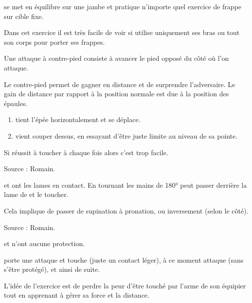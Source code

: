 \begin{exercice}
\A se met en équilibre sur une jambe et pratique n'importe quel exercice de frappe sur cible fixe.

Dans cet exercice il est très facile de voir si \A utilise uniquement ses bras ou tout son corps pour porter ses frappes.
\end{exercice}


\begin{coup}
\label{struct:coup:contre-pied}

Une attaque à contre-pied consiste à avancer le pied opposé du côté où l'on attaque.
\end{coup}

Le contre-pied permet de gagner en distance et de surprendre l'adversaire.
Le gain de distance par rapport à la position normale est due à la position des épaules.


\begin{exercice}

\begin{enumerate}
	\item \D tient l'épée horizontalement et se déplace.
	
	\item \A vient couper dessus, en essayant d'être juste limite au niveau de sa pointe.
\end{enumerate}

Si \A réussit à toucher à chaque fois alors c'est trop facile.

Source : Romain.

\end{exercice}


\begin{technique}
\label{struct:tech:changement-ligne}

\A et \D ont les lames en contact.
En tournant les mains de 180° \A peut passer derrière la lame de \D et le toucher.

Cela implique de passer de supination à pronation, ou inversement (selon le côté).

Source : Romain.
\end{technique}


\begin{exercice}
\A et \D n'ont aucune protection.

\A porte une attaque et touche \D (juste un contact léger), à ce moment \D attaque \A (sans s'être protégé), et ainsi de suite.

L'idée de l'exercice est de perdre la peur d'être touché par l'arme de son équipier tout en apprenant à gérer sa force et la distance.
\end{exercice}



